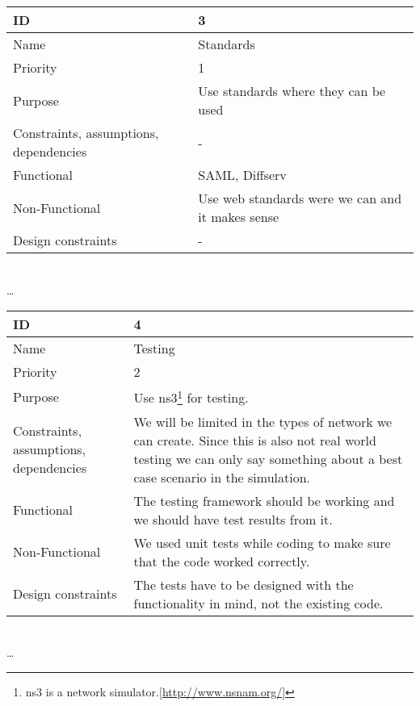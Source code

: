 \begin{center}
	\begin{tabular}{| p{4cm} | p{8cm} |}
		\hline
		ID & 3 \\
		\hline
		Name & Standards \\
		\hline
		Priority & 1 \\
		\hline
		Purpose & Use standards where they can be used \\
		\hline 
		Constraints, assumptions, dependencies & -\\
		\hline  
		Functional & SAML, Diffserv \\
		\hline
		Non-Functional & Use web standards were we can and it makes sense \\ 
		\hline
		Design constraints & - \\
		\hline
	\end{tabular}
	\\  \ldots  \\

	\begin{tabular}{| p{4cm} | p{8cm} |}
		\hline
		ID & 4 \\
		\hline
		Name & Testing  \\
		\hline
		Priority & 2 \\
		\hline
		Purpose & Use \gls{ns3}\footnote{\gls{ns3} is a network simulator.[\url{http://www.nsnam.org/}]} for testing. \\
		\hline 
		Constraints, assumptions, dependencies & We will be limited in the types of network we can create. Since this is also not real world testing we can only say something about a best case scenario in the simulation.\\
		\hline  
		Functional & The testing framework should be working and we should have test results from it.\\
		\hline
		Non-Functional & We used unit tests while coding to make sure that the code worked correctly. \\ 
		\hline
		Design constraints & The tests have to be designed with the functionality in mind, not the existing code. \\
		\hline
	\end{tabular}
	\\  \ldots  \\


\end{center}
